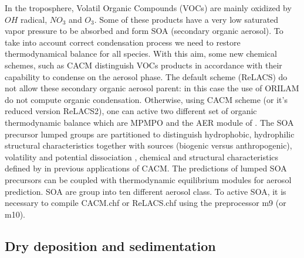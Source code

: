In the troposphere, Volatil Organic Compounds (VOCs) are mainly oxidized by $OH$ 
radical, $NO_3$ and $O_3$. Some of these products have a very low 
saturated vapor pressure to be absorbed and form SOA (secondary organic aerosol).
To take into account correct condensation process we need to restore 
thermodynamical balance for all species. 
With this aim, some new chemical schemes, such as CACM \citep{Griffin2002} 
distinguish VOCs products in
accordance with their capability to condense on the aerosol phase.
The default scheme (ReLACS) do not allow these secondary organic aerosol parent:
in this case the use of ORILAM do not compute organic condensation.
Otherwise, using CACM scheme (or it's reduced version ReLACS2), one can active two
different set of organic thermodynamic balance which are MPMPO \citep{Griffin2005} and the AER module of \citet{Pun2002}.  The SOA precursor lumped groups are partitioned to distinguish hydrophobic, hydrophilic structural characteristics \citet{Pun2002} together with sources (biogenic versus anthropogenic), volatility and potential dissociation  \citep{Griffin2005},  chemical and structural characteristics defined by \citet{Pun2002} in previous applications of CACM.  The predictions of lumped SOA precursors can be coupled with thermodynamic equilibrium modules for aerosol prediction.  SOA are group into ten different aerosol class.
To active SOA, it is necessary to compile CACM.chf or ReLACS.chf using the preprocessor m9 (or m10).

\subsection{Dry deposition and sedimentation}

